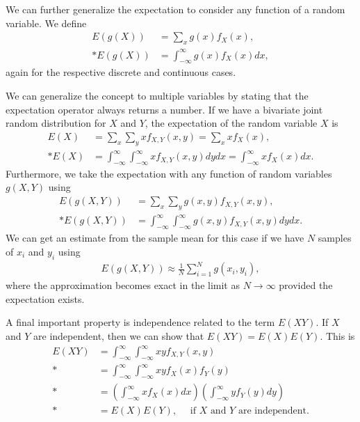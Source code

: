 We can further generalize the expectation to consider any function of a random variable. We define
\begin{subequations}
\begin{align}
  E(g(X)) &= \sum_x g(x) f_X(x), \\*
  E(g(X)) &= \int_{-\infty}^\infty g(x) f_X(x) dx ,
\end{align}
\end{subequations}
again for the respective discrete and continuous cases.

We can generalize the concept to multiple variables by stating that the expectation operator always returns a number. If we have a bivariate joint random distribution for $X$ and $Y$, the expectation of the random variable $X$ is
\begin{subequations}
\begin{align}
  E(X) &= \sum_x \sum_y x f_{X,Y}(x,y) = \sum_x x f_X(x), \\*
  E(X) &= \int_{-\infty}^\infty \int_{-\infty}^\infty x f_{X,Y}(x,y) dy dx = \int_{-\infty}^\infty x f_X(x) dx .
\end{align}
\end{subequations}
Furthermore, we take the expectation with any function of random variables $g(X,Y)$ using
\begin{subequations}
\begin{align}
  E(g(X,Y)) &= \sum_x \sum_y g(x,y) f_{X,Y}(x,y), \\*
  E(g(X,Y)) &= \int_{-\infty}^\infty \int_{-\infty}^\infty g(x,y) f_{X,Y}(x,y) dy dx .
\end{align}
\end{subequations}
We can get an estimate from the sample mean for this case if we have $N$ samples of $x_i$ and $y_i$ using
\begin{align}
  E(g(X,Y)) \approx \frac{1}{N} \sum_{i=1}^{N} g(x_i,y_i) ,
\end{align}
where the approximation becomes exact in the limit as $N \rightarrow \infty$ provided the expectation exists.

A final important property is independence related to the term $E(XY)$. If $X$ and $Y$ are independent, then we can show that $E(XY) = E(X)E(Y)$. This is
\begin{align}
  E(XY) &= \int_{-\infty}^\infty \int_{-\infty}^\infty xy f_{X,Y}(x,y) \nonumber \\*
  &= \int_{-\infty}^\infty \int_{-\infty}^\infty xy f_X(x) f_Y(y) \nonumber \\*
  &= \left(  \int_{-\infty}^\infty x f_X(x) dx \right) \left( \int_{-\infty}^\infty y f_Y(y) dy \right) \nonumber \\*
  &= E(X)E(Y), \quad \text{ if $X$ and $Y$ are independent.}
\end{align}

